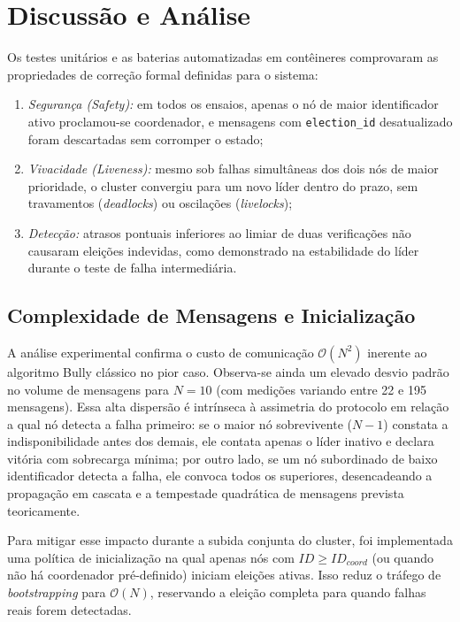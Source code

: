 \section{Discussão e Análise}
\label{sec:discussao}

Os testes unitários e as baterias automatizadas em contêineres comprovaram as
propriedades de correção formal definidas para o sistema:
\begin{enumerate}
    \item \textit{Segurança (Safety):} em todos os ensaios, apenas o nó de maior
    identificador ativo proclamou-se coordenador, e mensagens com
    \texttt{election\_id} desatualizado foram descartadas sem corromper o estado;
    \item \textit{Vivacidade (Liveness):} mesmo sob falhas simultâneas dos dois nós
    de maior prioridade, o cluster convergiu para um novo líder dentro do prazo,
    sem travamentos (\textit{deadlocks}) ou oscilações (\textit{livelocks});
    \item \textit{Detecção:} atrasos pontuais inferiores ao limiar de duas
    verificações não causaram eleições indevidas, como demonstrado na estabilidade
    do líder durante o teste de falha intermediária.
\end{enumerate}

\subsection{Complexidade de Mensagens e Inicialização}
A análise experimental confirma o custo de comunicação $\mathcal{O}(N^2)$ inerente
ao algoritmo Bully clássico no pior caso. Observa-se ainda um elevado desvio padrão
no volume de mensagens para $N=10$ (com medições variando entre 22 e 195 mensagens).
Essa alta dispersão é intrínseca à assimetria do protocolo em relação a qual nó
detecta a falha primeiro: se o maior nó sobrevivente ($N-1$) constata a
indisponibilidade antes dos demais, ele contata apenas o líder inativo e declara
vitória com sobrecarga mínima; por outro lado, se um nó subordinado de baixo
identificador detecta a falha, ele convoca todos os superiores, desencadeando a
propagação em cascata e a tempestade quadrática de mensagens prevista teoricamente.

Para mitigar esse impacto durante a subida conjunta do cluster, foi implementada
uma política de inicialização na qual apenas nós com $ID \ge ID_{coord}$ (ou quando
não há coordenador pré-definido) iniciam eleições ativas. Isso reduz o tráfego de
\textit{bootstrapping} para $\mathcal{O}(N)$, reservando a eleição completa para
quando falhas reais forem detectadas.

